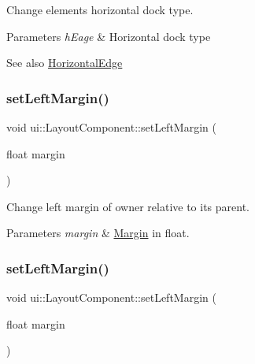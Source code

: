 Change element\textquotesingle{}s horizontal dock type. 
\begin{DoxyParams}{Parameters}
{\em h\+Eage} & Horizontal dock type \\
\hline
\end{DoxyParams}
\begin{DoxySeeAlso}{See also}
{\ttfamily \hyperlink{classui_1_1LayoutComponent_aaa61687a8a4e98f525413e1f0cfacf18}{Horizontal\+Edge}} 
\end{DoxySeeAlso}
\mbox{\label{classui_1_1LayoutComponent_a2e26517ace9816d2350b23e1f0bb482d}} 
\subsubsection{\texorpdfstring{set\+Left\+Margin()}{setLeftMargin()}\hspace{0.1cm}{\footnotesize\ttfamily [1/2]}}
{\footnotesize\ttfamily void ui\+::\+Layout\+Component\+::set\+Left\+Margin (\begin{DoxyParamCaption}\item[{float}]{margin }\end{DoxyParamCaption})}

Change left margin of owner relative to its parent. 
\begin{DoxyParams}{Parameters}
{\em margin} & \hyperlink{classui_1_1Margin}{Margin} in float. \\
\hline
\end{DoxyParams}
\mbox{\label{classui_1_1LayoutComponent_a2e26517ace9816d2350b23e1f0bb482d}} 
\subsubsection{\texorpdfstring{set\+Left\+Margin()}{setLeftMargin()}\hspace{0.1cm}{\footnotesize\ttfamily [2/2]}}
{\footnotesize\ttfamily void ui\+::\+Layout\+Component\+::set\+Left\+Margin (\begin{DoxyParamCaption}\item[{float}]{margin }\end{DoxyParamCaption})}

